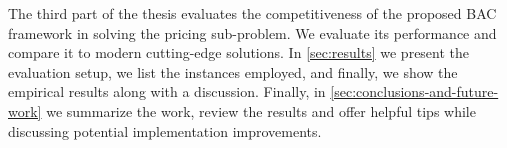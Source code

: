 The third part of the thesis evaluates the competitiveness of the proposed BAC framework
in solving the pricing sub-problem.
We evaluate its performance and compare it to modern cutting-edge solutions.
In \cref{sec:results} we present the evaluation setup, we list the instances employed,
and finally, we show the empirical results along with a discussion.
Finally, in \cref{sec:conclusions-and-future-work} we summarize the work, review the results
and offer helpful tips while discussing potential implementation improvements.
